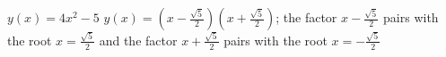 {$y(x)=4x^2-5$}
{$y(x) = (x-\frac{\sqrt{5}}{2})(x+\frac{\sqrt{5}}{2})$; the factor $x-\frac{\sqrt{5}}{2}$ pairs with the root $x=\frac{\sqrt{5}}{2}$ and the factor $x+\frac{\sqrt{5}}{2}$ pairs with the root $x=-\frac{\sqrt{5}}{2}$}

